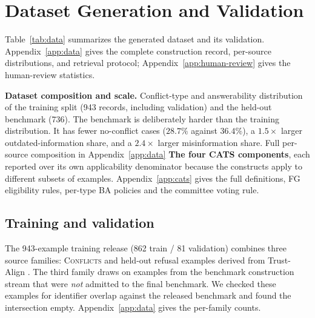\section{Dataset Generation and Validation}
\label{sec:data}

Table~\ref{tab:data} summarizes the generated dataset and its validation.
Appendix~\ref{app:data} gives the complete construction record, per-source
distributions, and retrieval protocol; Appendix~\ref{app:human-review} gives
the human-review statistics.

\begin{table}[htbp]
\centering
\begin{minipage}[t]{0.47\linewidth}\vspace{0pt}
\centering

\end{minipage}%
\hspace{0.03\linewidth}%
\begin{minipage}[t]{0.47\linewidth}\vspace{0pt}
\centering

\end{minipage}
%
{\textbf{Dataset composition and scale.} Conflict-type and answerability distribution of the training split (943 records, including validation) and the held-out benchmark (736). The benchmark is deliberately harder than the training distribution. It has fewer no-conflict cases ($28.7\%$ against $36.4\%$), a $1.5\times$ larger outdated-information share, and a $2.4\times$ larger misinformation share. Full per-source composition in Appendix~\ref{app:data}}%
{\textbf{The four CATS components}, each reported over its own applicability denominator because the constructs apply to different subsets of examples. Appendix~\ref{app:cats} gives the full definitions, FG eligibility rules, per-type BA policies and the committee voting rule.}
\end{table}

\subsection{Training and validation}

The 943-example training release (862 train / 81 validation) combines three
source families: \textsc{Conflicts} \citep{cattan2025dragged} and held-out
refusal examples derived from Trust-Align \citep{song2025trustalign}. The
third family draws on examples from the benchmark construction stream that
were \emph{not} admitted to the final benchmark. We checked these examples for
identifier overlap against the released benchmark and found the intersection
empty. Appendix~\ref{app:data} gives the per-family counts.

